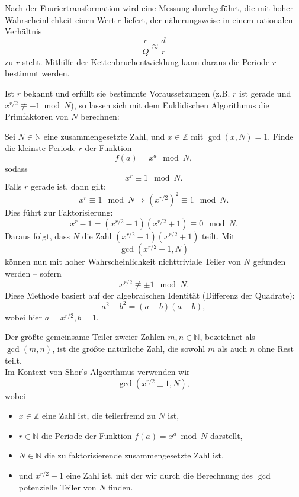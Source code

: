 Nach der Fouriertransformation wird eine Messung durchgeführt, die mit hoher Wahrscheinlichkeit einen Wert \( c \) liefert, der näherungsweise in einem rationalen Verhältnis  
\[
\frac{c}{Q} \approx \frac{d}{r}
\]
zu \( r \) steht. Mithilfe der Kettenbruchentwicklung kann daraus die Periode \( r \) bestimmt werden.

Ist \( r \) bekannt und erfüllt sie bestimmte Voraussetzungen (z.B. \( r \) ist gerade und \( x^{r/2} \not\equiv -1 \bmod N \)), so lassen sich mit dem Euklidischen Algorithmus die Primfaktoren von \( N \) berechnen: 

Sei \( N \in \mathbb{N} \) eine zusammengesetzte Zahl, und \( x \in \mathbb{Z} \) mit \(\gcd(x, N) = 1\).  
Finde die kleinste Periode \( r \) der Funktion
\[
f(a) = x^a \mod N,
\]
sodass
\[
x^r \equiv 1 \mod N.
\]
Falls \( r \) gerade ist, dann gilt:
\[
x^r \equiv 1 \mod N \Rightarrow (x^{r/2})^2 \equiv 1 \mod N.
\]
Dies führt zur Faktorisierung:
\[
x^r - 1 = (x^{r/2} - 1)(x^{r/2} + 1) \equiv 0 \mod N.
\]
Daraus folgt, dass \( N \) die Zahl \( (x^{r/2} - 1)(x^{r/2} + 1) \) teilt.
Mit
\[
\gcd(x^{r/2} \pm 1, N)
\]
können nun mit hoher Wahrscheinlichkeit nichttriviale Teiler von \( N \) gefunden werden – sofern
\[
x^{r/2} \not\equiv \pm 1 \mod N.
\]
Diese Methode basiert auf der algebraischen Identität (Differenz der Quadrate):
\[
a^2 - b^2 = (a - b)(a + b),
\]
wobei hier \( a = x^{r/2}, b = 1 \).

\begin{definition}
Der größte gemeinsame Teiler zweier Zahlen \(m, n \in \mathbb{N}\), bezeichnet als \(\gcd(m,n)\), ist die größte natürliche Zahl, die sowohl \(m\) als auch \(n\) ohne Rest teilt.\\

Im Kontext von Shor's Algorithmus verwenden wir
\[
\gcd\left(x^{r/2} \pm 1, N\right),
\]
wobei
\begin{itemize}
    \item \(x \in \mathbb{Z}\) eine Zahl ist, die teilerfremd zu \(N\) ist,
    \item \(r \in \mathbb{N}\) die Periode der Funktion \(f(a) = x^a \bmod N\) darstellt,
    \item \(N \in \mathbb{N}\) die zu faktorisierende zusammengesetzte Zahl ist,
    \item und \(x^{r/2} \pm 1\) eine Zahl ist, mit der wir durch die Berechnung des \(\gcd\) potenzielle Teiler von \(N\) finden.
\end{itemize}
\end{definition}

